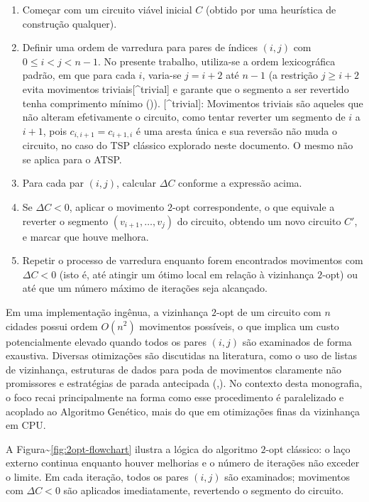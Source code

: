 \begin{enumerate}
\def\labelenumi{\arabic{enumi}.}
\tightlist
\item
  Começar com um circuito viável inicial \(C\) (obtido por uma
  heurística de construção qualquer).
\item
  Definir uma ordem de varredura para pares de índices \((i,j)\) com
  \(0 \leq i < j < n-1\). No presente trabalho, utiliza-se a ordem
  lexicográfica padrão, em que para cada \(i\), varia-se \(j = i+2\) até
  \(n-1\) (a restrição \(j \geq i+2\) evita movimentos
  triviais{[}\^{}trivial{]} e garante que o segmento a ser revertido
  tenha comprimento mínimo ()).
  {[}\^{}trivial{]}: Movimentos triviais são aqueles que não alteram
  efetivamente o circuito, como tentar reverter um segmento de \(i\) a
  \(i+1\), pois \(c_{i, i+1}=c_{i+1, i}\) é uma aresta única e sua
  reversão não muda o circuito, no caso do TSP clássico explorado neste
  documento. O mesmo não se aplica para o ATSP.
\item
  Para cada par \((i,j)\), calcular \(\Delta C\) conforme a expressão
  acima.
\item
  Se \(\Delta C < 0\), aplicar o movimento \(2\)-opt correspondente, o
  que equivale a reverter o segmento \((v_{i+1}, \dots, v_j)\) do
  circuito, obtendo um novo circuito \(C'\), e marcar que houve melhora.
\item
  Repetir o processo de varredura enquanto forem encontrados movimentos
  com \(\Delta C < 0\) (isto é, até atingir um ótimo local em relação à
  vizinhança \(2\)-opt) ou até que um número máximo de iterações seja
  alcançado.
\end{enumerate}

Em uma implementação ingênua, a vizinhança \(2\)-opt de um circuito com
\(n\) cidades possui ordem \(O(n^2)\) movimentos possíveis, o que
implica um custo potencialmente elevado quando todos os pares \((i,j)\)
são examinados de forma exaustiva. Diversas otimizações são discutidas
na literatura, como o uso de listas de vizinhança, estruturas de dados
para poda de movimentos claramente não promissores e estratégias de
parada antecipada
(,).
No contexto desta monografia, o foco recai principalmente na forma como
esse procedimento é paralelizado e acoplado ao Algoritmo Genético, mais
do que em otimizações finas da vizinhança em CPU.

A Figura\textasciitilde{}\ref{fig:2opt-flowchart} ilustra a lógica do
algoritmo \(2\)-opt clássico: o laço externo continua enquanto houver
melhorias e o número de iterações não exceder o limite. Em cada
iteração, todos os pares \((i,j)\) são examinados; movimentos com
\(\Delta C < 0\) são aplicados imediatamente, revertendo o segmento do
circuito.


